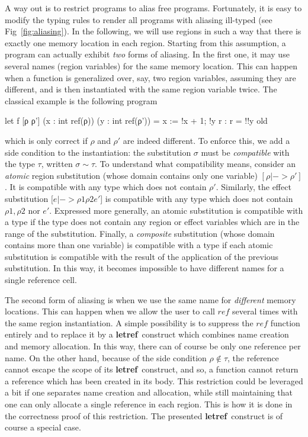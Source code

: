 \documentclass[a4paper]{llncs}
\newcommand{\letml}{{\bf let}}
\newcommand{\refml}{{\bf ref}}
\begin{document}
A way out is to restrict programs to alias free programs. Fortunately, it is
easy to modify the typing rules to render all programs with aliasing
ill-typed (see Fig~\ref{fig:aliasing}). In the following, we will use regions
in such a way that there is exactly one memory location in each region.
Starting from this assumption, a program can actually
exhibit {\em two} forms of aliasing. In the first one, it may use several
names (region variables) for the same memory location. This can happen when a
function is generalized over, say, two region variables, assuming they are
different, and is then instantiated with the same region variable twice. The
classical example is the following program
\begin{who}
  let f [ρ ρ'] (x : int ref(ρ)) (y : int ref(ρ')) =
  { }
  x := !x + 1;
  !y
  { r : r = !!y old }
\end{who}
which is only correct if $ ρ $ and $ ρ' $ are indeed different. To enforce
this, we add a side condition to the instantiation: the substitution $σ$ must
be {\em compatible} with the type $τ$, written $σ\sim τ$. To understand what
compatibility means, consider an {\em atomic} region substitution (whose
domain contains only one variable) $[ρ|->ρ']$. It is compatible with any type
which does not contain $ρ'$. Similarly, the effect substitution $[e|-> ρ1  ρ2
e'$] is compatible with any type which does not contain $ ρ1 , ρ2 $ nor $e'$.
Expressed more generally, an atomic substitution is compatible with a type if
the type does not contain any region or effect variables which are in the
range of the substitution. Finally, a {\em composite} substitution (whose
domain contains more than one variable) is compatible with a type if each
atomic substitution is compatible with the result of the application of the
previous substitution. In this way, it becomes impossible to have different
names for a single reference cell.

The second form of aliasing is when we use the same name for {\em different}
memory locations. This can happen when we allow the user to call
$\mathit{ref}$ several times with the same region instantiation. A simple
possibility is to  suppress the $\mathit{ref}$ function entirely and to
replace it by a \letml\refml\ construct which combines name creation and
memory allocation. In this way, there can of course be only one reference per
name. On the other hand, because of the side condition $ρ\notin τ$, the
reference cannot escape the scope of its \letml\refml\ construct, and so, a
function cannot return a reference which has been created in its body. This
restriction could be leveraged a bit if one separates name creation and
allocation, while still maintaining that one can only allocate a single
reference in each region. This is how it is done in the correctness proof of
this restriction. The presented \letml\refml\ construct is of course a special
case.
\end{document}
